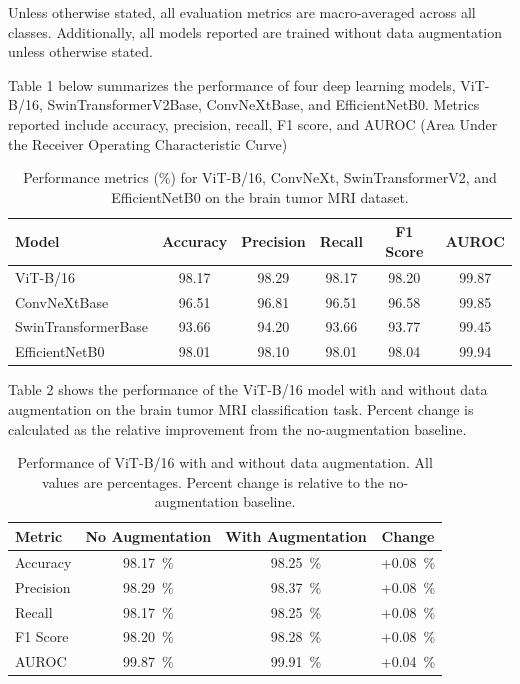 \documentclass[11pt]{article}
\begin{document}
Unless otherwise stated, all evaluation metrics are macro-averaged across all classes. Additionally, all models reported are trained without data augmentation unless otherwise stated.


Table 1 below summarizes the performance of four deep learning models, ViT-B/16, SwinTransformerV2Base, ConvNeXtBase, and EfficientNetB0. Metrics reported include accuracy, precision, recall, F1 score, and AUROC (Area Under the Receiver Operating Characteristic Curve)

\begin{table}[H]
\centering
\caption{Performance metrics (\%) for ViT-B/16, ConvNeXt, SwinTransformerV2, and EfficientNetB0 on the brain tumor MRI dataset.}
\begin{tabular}{lccccc}
\toprule
\textbf{Model} & \textbf{Accuracy} & \textbf{Precision} & \textbf{Recall} & \textbf{F1 Score} & \textbf{AUROC} \\
\midrule
ViT-B/16           & 98.17 & 98.29 & 98.17 & 98.20 & 99.87 \\
ConvNeXtBase       & 96.51 & 96.81 & 96.51 & 96.58 & 99.85 \\
SwinTransformerBase& 93.66 & 94.20 & 93.66 & 93.77 & 99.45 \\
EfficientNetB0     & 98.01 & 98.10 & 98.01 & 98.04 & 99.94 \\
\bottomrule
\end{tabular}
\label{tab:model_comparison}
\end{table}


Table 2 shows the performance of the ViT-B/16 model with and without data augmentation on the brain tumor MRI classification task. Percent change is calculated as the relative improvement from the no-augmentation baseline.

\begin{table}[H]
\centering
\caption{Performance of ViT-B/16 with and without data augmentation. All values are percentages. Percent change is relative to the no-augmentation baseline.}
\begin{tabular}{lccc}
\toprule
\textbf{Metric} & \textbf{No Augmentation} & \textbf{With Augmentation} & \textbf{Change} \\
\midrule
Accuracy   & 98.17~\% & 98.25~\% & +0.08~\% \\
Precision  & 98.29~\% & 98.37~\% & +0.08~\% \\
Recall     & 98.17~\% & 98.25~\% & +0.08~\% \\
F1 Score   & 98.20~\% & 98.28~\% & +0.08~\% \\
AUROC      & 99.87~\% & 99.91~\% & +0.04~\% \\
\bottomrule
\end{tabular}
\label{tab:augmentation_comparison}
\end{table}
\end{document}
